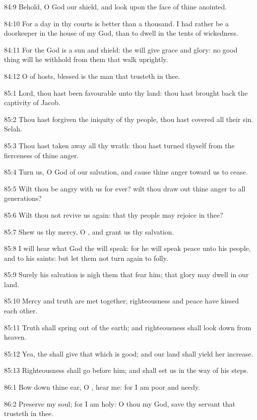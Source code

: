 84:9 Behold, O God our shield, and look upon the face of thine
anointed.

84:10 For a day in thy courts is better than a thousand. I had rather
be a doorkeeper in the house of my God, than to dwell in the tents of
wickedness.

84:11 For the \LORD God is a sun and shield: the \LORD will give grace
and glory: no good thing will he withhold from them that walk
uprightly.

84:12 O \LORD of hosts, blessed is the man that trusteth in thee.



85:1 Lord, thou hast been favourable unto thy land: thou hast brought
back the captivity of Jacob.

85:2 Thou hast forgiven the iniquity of thy people, thou hast covered
all their sin. Selah.

85:3 Thou hast taken away all thy wrath: thou hast turned thyself from
the fierceness of thine anger.

85:4 Turn us, O God of our salvation, and cause thine anger toward us
to cease.

85:5 Wilt thou be angry with us for ever? wilt thou draw out thine
anger to all generations?

85:6 Wilt thou not revive us again: that thy people may rejoice in
thee?

85:7 Shew us thy mercy, O \LORD, and grant us thy salvation.

85:8 I will hear what God the \LORD will speak: for he will speak peace
unto his people, and to his saints: but let them not turn again to
folly.

85:9 Surely his salvation is nigh them that fear him; that glory may
dwell in our land.

85:10 Mercy and truth are met together; righteousness and peace have
kissed each other.

85:11 Truth shall spring out of the earth; and righteousness shall
look down from heaven.

85:12 Yea, the \LORD shall give that which is good; and our land shall
yield her increase.

85:13 Righteousness shall go before him; and shall set us in the way
of his steps.



86:1 Bow down thine ear, O \LORD, hear me: for I am poor and needy.

86:2 Preserve my soul; for I am holy: O thou my God, save thy servant
that trusteth in thee.

